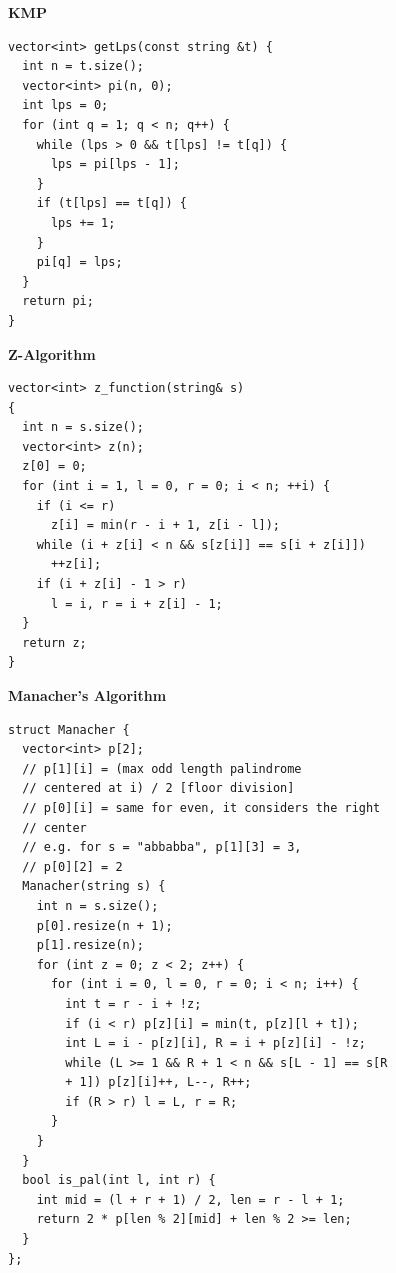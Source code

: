 \textbf{KMP}
\begin{lstlisting}
vector<int> getLps(const string &t) {
  int n = t.size();
  vector<int> pi(n, 0);
  int lps = 0;
  for (int q = 1; q < n; q++) {
    while (lps > 0 && t[lps] != t[q]) {
      lps = pi[lps - 1];
    }
    if (t[lps] == t[q]) {
      lps += 1;
    }
    pi[q] = lps;
  }
  return pi;
}
\end{lstlisting}

\textbf{Z-Algorithm}
\begin{lstlisting}
vector<int> z_function(string& s)
{
  int n = s.size();
  vector<int> z(n);
  z[0] = 0;
  for (int i = 1, l = 0, r = 0; i < n; ++i) {
    if (i <= r)
      z[i] = min(r - i + 1, z[i - l]);
    while (i + z[i] < n && s[z[i]] == s[i + z[i]])
      ++z[i];
    if (i + z[i] - 1 > r)
      l = i, r = i + z[i] - 1;
  }
  return z;
}
\end{lstlisting}

\textbf{Manacher's Algorithm}
\begin{lstlisting}
struct Manacher {
  vector<int> p[2];
  // p[1][i] = (max odd length palindrome
  // centered at i) / 2 [floor division]
  // p[0][i] = same for even, it considers the right
  // center
  // e.g. for s = "abbabba", p[1][3] = 3,
  // p[0][2] = 2
  Manacher(string s) {
    int n = s.size();
    p[0].resize(n + 1);
    p[1].resize(n);
    for (int z = 0; z < 2; z++) {
      for (int i = 0, l = 0, r = 0; i < n; i++) {
        int t = r - i + !z;
        if (i < r) p[z][i] = min(t, p[z][l + t]);
        int L = i - p[z][i], R = i + p[z][i] - !z;
        while (L >= 1 && R + 1 < n && s[L - 1] == s[R
        + 1]) p[z][i]++, L--, R++;
        if (R > r) l = L, r = R;
      }
    }
  }
  bool is_pal(int l, int r) {
    int mid = (l + r + 1) / 2, len = r - l + 1;
    return 2 * p[len % 2][mid] + len % 2 >= len;
  }
};
\end{lstlisting}
